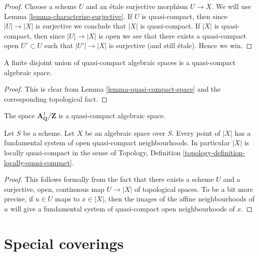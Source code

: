 \begin{proof}
Choose a scheme $U$ and an \'etale surjective morphism $U \to X$.
We will use Lemma \ref{lemma-characterize-surjective}.
If $U$ is quasi-compact, then since $|U| \to |X|$ is surjective
we conclude that $|X|$ is quasi-compact.
If $|X|$ is quasi-compact, then since $|U| \to |X|$ is open
we see that there exists a quasi-compact open $U' \subset U$
such that $|U'| \to |X|$ is surjective (and still \'etale).
Hence we win.
\end{proof}

\begin{lemma}
\label{lemma-finite-disjoint-quasi-compact}
A finite disjoint union of quasi-compact algebraic spaces is
a quasi-compact algebraic space.
\end{lemma}

\begin{proof}
This is clear from
Lemma \ref{lemma-quasi-compact-space}
and the corresponding topological fact.
\end{proof}

\begin{example}
\label{example-quasi-compact-not-very-reasonable}
The space $\mathbf{A}^1_{\mathbf{Q}}/\mathbf{Z}$ is a quasi-compact
algebraic space.
\end{example}

\begin{lemma}
\label{lemma-space-locally-quasi-compact}
Let $S$ be a scheme.
Let $X$ be an algebraic space over $S$.
Every point of $|X|$ has a fundamental system of open
quasi-compact neighbourhoods.
In particular $|X|$ is locally quasi-compact in the sense of
Topology, Definition \ref{topology-definition-locally-quasi-compact}.
\end{lemma}

\begin{proof}
This follows formally from the fact that there exists a scheme
$U$ and a surjective, open, continuous map
$U \to |X|$ of topological spaces. To be a bit more precise, if
$u \in U$ maps to $x \in |X|$, then the images of the affine
neighbourhoods of $u$ will give a fundamental system of quasi-compact
open neighbourhoods of $x$.
\end{proof}







\section{Special coverings}
\label{section-special-coverings}

